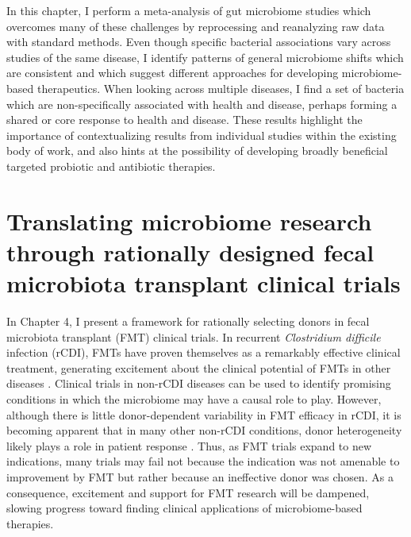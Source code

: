 In this chapter, I perform a meta-analysis of gut microbiome studies which overcomes many of these challenges by reprocessing and reanalyzing raw data with standard methods.
Even though specific bacterial associations vary across studies of the same disease, I identify patterns of general microbiome shifts which are consistent  and which suggest different approaches for developing microbiome-based therapeutics.
When looking across multiple diseases, I find a set of bacteria which are non-specifically associated with health and disease, perhaps forming a shared or core response to health and disease.
These results highlight the importance of contextualizing results from individual studies within the existing body of work, and also hints at the possibility of developing broadly beneficial targeted probiotic and antibiotic therapies.

\section{Translating microbiome research through rationally designed fecal microbiota transplant clinical trials}

In Chapter 4, I present a framework for rationally selecting donors in fecal microbiota transplant (FMT) clinical trials.
In recurrent \textit{Clostridium difficile} infection (rCDI), FMTs have proven themselves as a remarkably effective clinical treatment, generating excitement about the clinical potential of FMTs in other diseases \cite{quraishi-2017-rcdifmt,bafeta-2017-fmt}.
Clinical trials in non-rCDI diseases can be used to identify promising conditions in which the microbiome may have a causal role to play.
However, although there is little donor-dependent variability in FMT efficacy in rCDI, it is becoming apparent that in many other non-rCDI conditions, donor heterogeneity likely plays a role in patient response \cite{moayyedi-2015,olesen-2018-superstool}.
Thus, as FMT trials expand to new indications, many trials may fail not because the indication was not amenable to improvement by FMT but rather because an ineffective donor was chosen.
As a consequence, excitement and support for FMT research will be dampened, slowing progress toward finding clinical applications of microbiome-based therapies.

